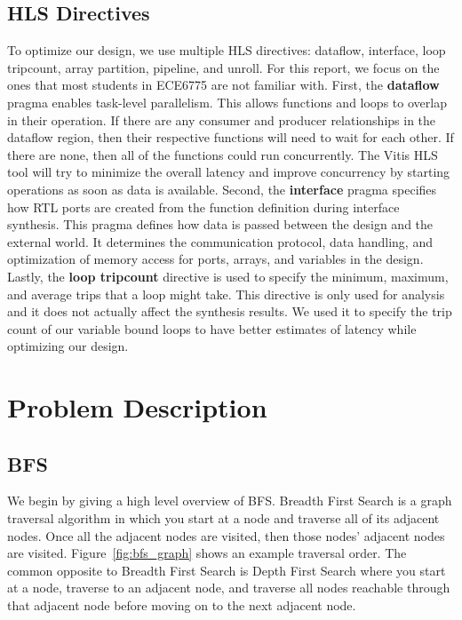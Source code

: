 \documentclass[10pt]{article}
\begin{document}
\subsection{HLS Directives}
To optimize our design, we use multiple HLS directives: dataflow, interface, loop tripcount,
array partition, pipeline, and unroll. For this report, we focus on the ones that most students 
in ECE6775 are not familiar with. First, the \textbf{dataflow} pragma enables task-level parallelism. 
This allows functions and loops to overlap in their operation. If there are any consumer and producer 
relationships in the dataflow region, then their respective functions will need to wait for each 
other. If there are none, then all of the functions could run concurrently. The Vitis HLS tool 
will try to minimize the overall latency and improve concurrency by starting operations as soon 
as data is available. Second, the \textbf{interface} pragma specifies how RTL ports are created from 
the function definition during interface synthesis. This pragma defines how data is passed between 
the design and the external world. It determines the communication protocol, data handling, and 
optimization of memory access for ports, arrays, and variables in the design. Lastly, the 
\textbf{loop tripcount} directive is used to specify the minimum, maximum, and average trips that a 
loop might take. This directive is only used for analysis and it does not actually affect the synthesis 
results. We used it to specify the trip count of our variable bound loops to have better estimates of 
latency while optimizing our design. \newline

\section{Problem Description}

\subsection{BFS}
We begin by giving a high level overview of BFS. Breadth First Search is a graph traversal algorithm
in which you start at a node and traverse all of its adjacent nodes. Once all the adjacent nodes are visited,
then those nodes' adjacent nodes are visited. Figure~\ref{fig:bfs_graph} shows an example traversal order. 
The common opposite to Breadth First Search is Depth First Search where you start at a node, traverse to an 
adjacent node, and traverse all nodes reachable through that adjacent node before moving on to the next adjacent
node. \newline
\end{document}
